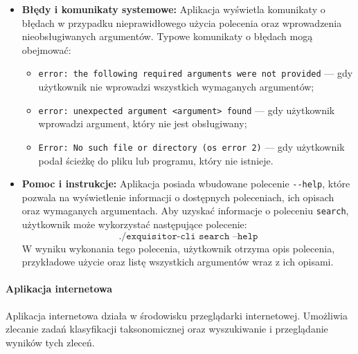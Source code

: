 \begin{itemize}
{                    }
                    \item {
                        \textbf{Błędy i komunikaty systemowe:}
                        Aplikacja wyświetla komunikaty o błędach w przypadku nieprawidłowego użycia polecenia oraz wprowadzenia nieobsługiwanych argumentów. Typowe komunikaty o błędach mogą obejmować:
                        \begin{itemize}
                            \item {
                                \texttt{error: the following required arguments were not provided} — gdy użytkownik nie wprowadzi wszystkich wymaganych argumentów;
                            }
                            \item {
                                \texttt{error: unexpected argument <argument> found} — gdy użytkownik wprowadzi argument, który nie jest obsługiwany;
                            }
                            \item {
                                \texttt{Error: No such file or directory (os error 2)} — gdy użytkownik podał ścieżkę do pliku lub programu, który nie istnieje.
                            }
                        \end{itemize}
                    }
                    \item {
                        \textbf{Pomoc i instrukcje:}
                        Aplikacja posiada wbudowane polecenie \texttt{-\phantom{}-help}, które pozwala na wyświetlenie informacji o dostępnych poleceniach, ich opisach oraz wymaganych argumentach.
                        Aby uzyskać informacje o poleceniu \texttt{search}, użytkownik może wykorzystać następujące polecenie:
                        \[
                            \texttt{./exquisitor-cli search --help}
                        \]
                        W wyniku wykonania tego polecenia, użytkownik otrzyma opis polecenia, przykładowe użycie oraz listę wszystkich argumentów wraz z ich opisami.
                    }

                \end{itemize}

            \paragraph{Aplikacja internetowa}
                Aplikacja internetowa działa w środowisku przeglądarki internetowej. Umożliwia zlecanie zadań klasyfikacji taksonomicznej oraz wyszukiwanie i przeglądanie wyników tych zleceń.


